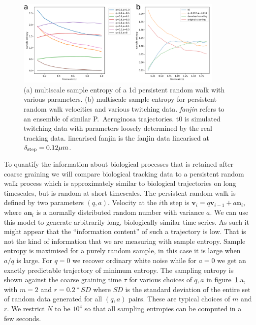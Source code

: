 \documentclass{article}
\newcommand{\vct}[1]{\bm{#1}} %
\begin{document}
\begin{figure}[h]
    \centering
    \includegraphics[width=0.9\textwidth]{composite_sample_entropy.png}
    \caption{
        (a) multiscale sample entropy of a 1d persistent random walk
        with various parameters.
        (b) multiscale sample entropy for persistent random 
        walk velocities and various twitching data. \textit{fanjin} refers to an ensemble
        of similar P.~Aeruginosa trajectories. t0 is simulated twitching data
        with parameters loosely determined by the real tracking data.
        linearised fanjin is the fanjin data linearised at $\delta_{\text{step}} = 0.12\mu m$.
    }
    \label{fig:entropy}
\end{figure}

To quantify the information about biological processes that is retained after coarse graining
we will compare biological tracking data to a persistent random walk process
which is approximately similar to biological trajectories on 
long timescales\cite{dieterich2008anomalous,metzner2015superstatistical},
but is random at short timescales.
The persistent random walk is defined by two parameters $(q, a)$.
Velocity at the $i$th step is
$\vct{v}_i = q\vct{v}_{i-1} + a\vct{n}_i$, where
$a\vct{n}_i$ is a normally distributed random number with variance $a$.
We can use this model to generate arbitrarily long, biologically similar time series.
As such it might appear that the ``information content'' of such a trajectory is low.
That is not the kind of information that we are measuring with sample entropy. 
Sample entropy
is maximised for a purely random sample, in this case it 
is large when  $a/q$ is large. For $q = 0$ we recover ordinary white noise 
while for $a = 0$ we get an exactly predictable trajectory of minimum entropy.
The sampling entropy is shown against the coarse graining time $\tau$
for various choices of $q,a$ in figure~\ref{fig:entropy}.a, with $m=2$
and $r=0.2*SD$ where $SD$ is the standard deviation of the entire 
set of random data generated for all $(q,a)$ pairs. These are typical choices
of $m$ and $r$\cite{delgado2019approximate}. We restrict $N$ to be $10^4$
so that all sampling entropies can be computed in a few seconds.
\end{document}
